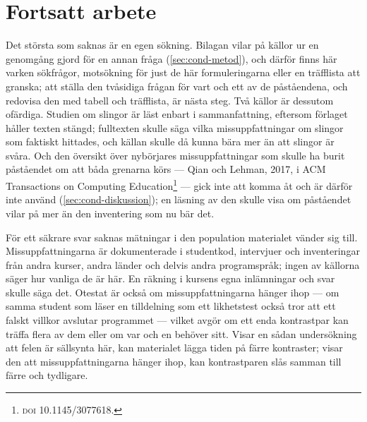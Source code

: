 \section{Fortsatt arbete}
\label{sec:cond-fortsatt}

Det största som saknas är en egen sökning.  Bilagan vilar på källor ur
en genomgång gjord för en annan fråga (\cref{sec:cond-metod}), och
därför finns här varken sökfrågor, motsökning för just de här
formuleringarna eller en träfflista att granska; att ställa den
tvåsidiga frågan för vart och ett av de 
påståendena, och redovisa
den med tabell och träfflista, är nästa steg.  Två källor är dessutom
ofärdiga.  Studien om slingor är läst enbart i
sammanfattning\autocite{Eckert2022Loops}, eftersom förlaget håller
texten stängd; fulltexten skulle säga vilka missuppfattningar om
slingor som faktiskt hittades, och källan skulle då kunna bära mer än
att slingor är svåra.  Och den översikt över nybörjares
missuppfattningar som skulle ha burit påståendet om att båda grenarna
körs --- Qian och Lehman, 2017, i \foreignlanguage{english}{ACM
Transactions on Computing Education}\footnote{\textsc{doi}
10.1145/3077618.} --- gick inte att komma åt och är därför inte använd
(\cref{sec:cond-diskussion}); en läsning av den skulle visa om
påståendet vilar på mer än den inventering som nu bär det.

För ett säkrare svar saknas mätningar i den population materialet
vänder sig till.  Missuppfattningarna är dokumenterade i studentkod,
intervjuer och inventeringar från andra kurser, andra länder och delvis
andra programspråk; ingen av källorna säger hur vanliga de är här.  En
räkning i kursens egna inlämningar och svar skulle säga det.  Otestat
är också om missuppfattningarna hänger ihop --- om samma student
som läser en tilldelning som ett likhetstest också tror att ett falskt
villkor avslutar programmet --- vilket avgör om ett enda kontrastpar
kan träffa flera av dem eller om var och en behöver sitt.  Visar en
sådan undersökning att felen är sällsynta här, kan materialet lägga
tiden på färre kontraster; visar den att missuppfattningarna hänger
ihop, kan kontrastparen slås samman till färre och tydligare.



